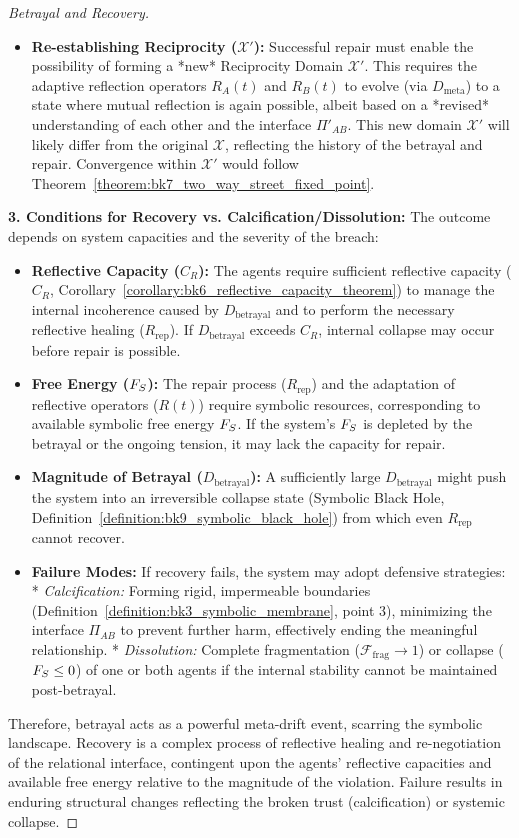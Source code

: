 \begin{proof}[Betrayal and Recovery]
\begin{itemize}
    \item \textbf{Re-establishing Reciprocity ($\mathcal{X}'$):} Successful repair must enable the possibility of forming a *new* Reciprocity Domain $\mathcal{X}'$. This requires the adaptive reflection operators $R_A(t)$ and $R_B(t)$ to evolve (via $D_{\text{meta}}$) to a state where mutual reflection is again possible, albeit based on a *revised* understanding of each other and the interface $\Pi'_{AB}$. This new domain $\mathcal{X}'$ will likely differ from the original $\mathcal{X}$, reflecting the history of the betrayal and repair. Convergence within $\mathcal{X}'$ would follow Theorem~\ref{theorem:bk7_two_way_street_fixed_point}.
\end{itemize}
\textbf{3. Conditions for Recovery vs. Calcification/Dissolution:}
The outcome depends on system capacities and the severity of the breach:
\begin{itemize}
    \item \textbf{Reflective Capacity ($C_R$):} The agents require sufficient reflective capacity ($C_R$, Corollary~\ref{corollary:bk6_reflective_capacity_theorem}) to manage the internal incoherence caused by $D_{\text{betrayal}}$ and to perform the necessary reflective healing ($R_{\text{rep}}$). If $D_{\text{betrayal}}$ exceeds $C_R$, internal collapse may occur before repair is possible.
    \item \textbf{Free Energy ($F_S$):} The repair process ($R_{\text{rep}}$) and the adaptation of reflective operators ($R(t)$) require symbolic resources, corresponding to available symbolic free energy $F_S$. If the system's $F_S$ is depleted by the betrayal or the ongoing tension, it may lack the capacity for repair.
    \item \textbf{Magnitude of Betrayal ($D_{\text{betrayal}}$):} A sufficiently large $D_{\text{betrayal}}$ might push the system into an irreversible collapse state (Symbolic Black Hole, Definition~\ref{definition:bk9_symbolic_black_hole}) from which even $R_{\text{rep}}$ cannot recover.
    \item \textbf{Failure Modes:} If recovery fails, the system may adopt defensive strategies:
        *   \emph{Calcification:} Forming rigid, impermeable boundaries (Definition~\ref{definition:bk3_symbolic_membrane}, point 3), minimizing the interface $\Pi_{AB}$ to prevent further harm, effectively ending the meaningful relationship.
        *   \emph{Dissolution:} Complete fragmentation ($\mathcal{F}_{\text{frag}} \to 1$) or collapse ($F_S \le 0$) of one or both agents if the internal stability cannot be maintained post-betrayal.
\end{itemize}
Therefore, betrayal acts as a powerful meta-drift event, scarring the symbolic landscape. Recovery is a complex process of reflective healing and re-negotiation of the relational interface, contingent upon the agents' reflective capacities and available free energy relative to the magnitude of the violation. Failure results in enduring structural changes reflecting the broken trust (calcification) or systemic collapse.
\end{proof}
